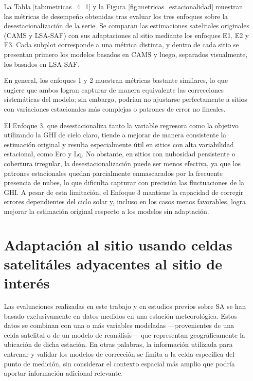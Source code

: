 La Tabla \ref{tab:metricas_4_1} y la Figura \ref{fig:metricas_estacionalidad} muestran las métricas de desempeño obtenidas tras evaluar los tres enfoques sobre la desestacionalización de la serie. Se comparan las estimaciones satelitales originales (CAMS y LSA-SAF) con sus adaptaciones al sitio mediante los enfoques E1, E2 y E3. Cada subplot corresponde a una métrica distinta, y dentro de cada sitio se presentan primero los modelos basados en CAMS y luego, separados visualmente, los basados en LSA-SAF.

En general, los enfoques 1 y 2 muestran métricas bastante similares, lo que sugiere que ambos logran capturar de manera equivalente las correcciones sistemáticas del modelo; sin embargo, podrían no ajustarse perfectamente a sitios con variaciones estacionales más complejas o patrones de error no lineales.

El Enfoque 3, que desestacionaliza tanto la variable regresora como la objetivo utilizando la GHI de cielo claro, tiende a mejorar de manera consistente la estimación original y resulta especialmente útil en sitios con alta variabilidad estacional, como Ero y Lq. No obstante, en sitios con nubosidad persistente o cobertura irregular, la desestacionalización puede ser menos efectiva, ya que los patrones estacionales quedan parcialmente enmascarados por la frecuente presencia de nubes, lo que dificulta capturar con precisión las fluctuaciones de la GHI. A pesar de esta limitación, el Enfoque 3 mantiene la capacidad de corregir errores dependientes del ciclo solar y, incluso en los casos menos favorables, logra mejorar la estimación original respecto a los modelos sin adaptación.





\section{Adaptación al sitio usando celdas satelitáles adyacentes al sitio de interés}
Las evaluaciones realizadas en este trabajo y en estudios previos sobre SA se han basado exclusivamente en datos medidos en una estación meteorológica. Estos datos se combinan con una o más variables modeladas —provenientes de una celda satelital o de un modelo de reanálisis— que representan geográficamente la ubicación de dicha estación. En otras palabras, la información utilizada para entrenar y validar los modelos de corrección se limita a la celda específica del punto de medición, sin considerar el contexto espacial más amplio que podría aportar información adicional relevante.\\

